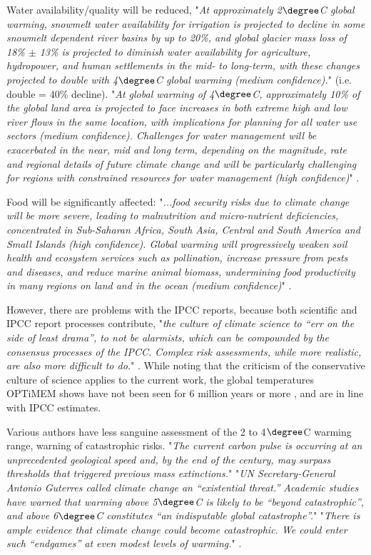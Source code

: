 \documentclass{article}
\begin{document}
Water availability/quality will be reduced, "\emph{At approximately 2$\degree$C global warming, snowmelt water availability for irrigation is projected to decline in some snowmelt dependent river basins by up to 20\%, and global glacier mass loss of 18\% $\pm$ 13\% is projected to diminish water availability for agriculture, hydropower, and human settlements in the mid- to long-term, with these changes projected to double with 4$\degree$C global warming (medium confidence).}" (i.e. double = 40\% decline). "\emph{At global warming of 4$\degree$C, approximately 10\% of the global land area is projected to face increases in both extreme high and low river flows in the same location, with implications for planning for all water use sectors (medium confidence). Challenges for water management will be exacerbated in the near, mid and long term, depending on the magnitude, rate and regional details of future climate change and will be particularly challenging for regions with constrained resources for water management (high confidence)}" \cite[p. 14]{IPCC_AR6_WG3_Report}. 

Food will be significantly affected: "\emph{...food security risks due to climate change will be more severe, leading to malnutrition and micro-nutrient deficiencies, concentrated in Sub-Saharan Africa, South Asia, Central and South America and Small Islands (high confidence). Global warming will progressively weaken soil health and ecosystem services such as pollination, increase pressure from pests and diseases, and reduce marine animal biomass, undermining food productivity in many regions on land and in the ocean (medium confidence)}" \cite[p. 14]{IPCC_AR6_WG3_Report}. 

However, there are problems with the IPCC reports, because both scientific and IPCC report processes contribute, "\emph{the culture of climate science to “err on the side of least drama”, to not  be alarmists, which can be compounded by the consensus processes of the IPCC. Complex risk assessments, while more realistic, are also more difficult to do.}" \cite{Kemp2022ClimateEndgame}. While noting that the criticism of the conservative culture of science applies to the current work, the global temperatures OPTiMEM shows have not been seen for 6 million years or more \cite{Burke2018Plio}, and are in line with IPCC estimates. 

Various authors have less sanguine assessment of  the 2 to 4$\degree$C warming range, warning of catastrophic risks. "\emph{The current carbon pulse is occurring at an unprecedented geological speed and, by the end of the century, may surpass thresholds that triggered previous mass extinctions.}" "\emph{UN Secretary-General Antonio Guterres called climate change an “existential threat.” Academic studies have warned that warming above 5$\degree$C is likely to be “beyond catastrophic”, and above 6$\degree$C constitutes “an indisputable global catastrophe”.}" "\emph{There is ample evidence that climate change could become catastrophic. We could enter such “endgames” at even modest levels of warming.}" \cite{Kemp2022ClimateEndgame}.
\end{document}
